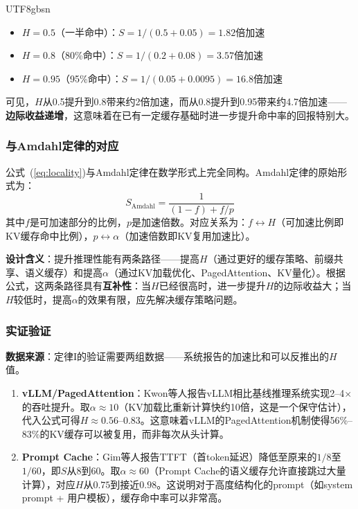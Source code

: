 \documentclass[11pt,a4paper]{article}
\begin{document}
\begin{CJK*}{UTF8}{gbsn}
\begin{itemize}[nosep]
\item $H = 0.5$（一半命中）：$S = 1/(0.5 + 0.05) = 1.82$倍加速
\item $H = 0.8$（80\%命中）：$S = 1/(0.2 + 0.08) = 3.57$倍加速
\item $H = 0.95$（95\%命中）：$S = 1/(0.05 + 0.0095) = 16.8$倍加速
\end{itemize}

可见，$H$从0.5提升到0.8带来约2倍加速，而从0.8提升到0.95带来约4.7倍加速——\textbf{边际收益递增}，这意味着在已有一定缓存基础时进一步提升命中率的回报特别大。

\subsubsection{与Amdahl定律的对应}

公式~(\ref{eq:locality})与Amdahl定律在数学形式上完全同构。Amdahl定律的原始形式为：
\begin{equation}
S_{\mathrm{Amdahl}} = \frac{1}{(1-f) + f/p}
\end{equation}
其中$f$是可加速部分的比例，$p$是加速倍数。对应关系为：$f \leftrightarrow H$（可加速比例即KV缓存命中比例），$p \leftrightarrow \alpha$（加速倍数即KV复用加速比）。

\textbf{设计含义}：提升推理性能有两条路径——提高$H$（通过更好的缓存策略、前缀共享、语义缓存\cite{gim2024promptcache}）和提高$\alpha$（通过KV加载优化、PagedAttention\cite{kwon2023pagedattention}、KV量化\cite{hooper2024kvquant}）。根据公式，这两条路径具有\textbf{互补性}：当$H$已经很高时，进一步提升$H$的边际收益大；当$H$较低时，提高$\alpha$的效果有限，应先解决缓存策略问题。

\subsubsection{实证验证}

\textbf{数据来源}：定律I的验证需要两组数据——系统报告的加速比和可以反推出的$H$值。

\begin{enumerate}[nosep]
\item \textbf{vLLM/PagedAttention}：Kwon等人报告vLLM相比基线推理系统实现2--4$\times$的吞吐提升\cite{kwon2023pagedattention}。取$\alpha \approx 10$（KV加载比重新计算快约10倍，这是一个保守估计），代入公式可得$H \approx 0.56$--$0.83$。这意味着vLLM的PagedAttention机制使得56\%--83\%的KV缓存可以被复用，而非每次从头计算。

\item \textbf{Prompt Cache}：Gim等人报告TTFT（首token延迟）降低至原来的$1/8$至$1/60$\cite{gim2024promptcache}，即$S$从8到60。取$\alpha \approx 60$（Prompt Cache的语义缓存允许直接跳过大量计算），对应$H$从$0.75$到接近$0.98$。这说明对于高度结构化的prompt（如system prompt + 用户模板），缓存命中率可以非常高。
\end{enumerate}


\end{CJK*}
\end{document}
